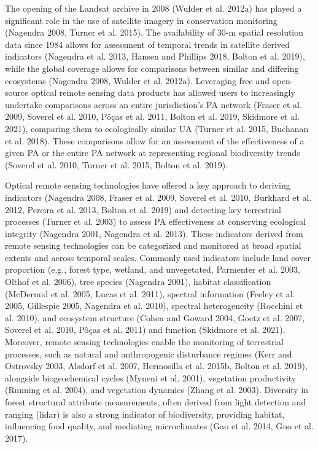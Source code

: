 \documentclass[11pt]{article}
\begin{document}
The opening of the Landsat archive in 2008 (Wulder et al. 2012a) has
played a significant role in the use of satellite imagery in
conservation monitoring (Nagendra 2008, Turner et al. 2015). The
availability of 30-m spatial resolution data since 1984 allows for
assessment of temporal trends in satellite derived indicators (Nagendra
et al. 2013, Hansen and Phillips 2018, Bolton et al. 2019), while the
global coverage allows for comparisons between similar and differing
ecosystems (Nagendra 2008, Wulder et al. 2012a). Leveraging free and
open-source optical remote sensing data products has allowed users to
increasingly undertake comparisons across an entire jurisdiction's PA
network (Fraser et al. 2009, Soverel et al. 2010, Pôças et al. 2011,
Bolton et al. 2019, Skidmore et al. 2021), comparing them to
ecologically similar UA (Turner et al. 2015, Buchanan et al. 2018).
These comparisons allow for an assessment of the effectiveness of a
given PA or the entire PA network at representing regional biodiversity
trends (Soverel et al. 2010, Turner et al. 2015, Bolton et al. 2019).

Optical remote sensing technologies have offered a key approach to
deriving indicators (Nagendra 2008, Fraser et al. 2009, Soverel et al.
2010, Burkhard et al. 2012, Pereira et al. 2013, Bolton et al. 2019) and
detecting key terrestrial processes (Turner et al. 2003) to assess PA
effectiveness at conserving ecological integrity (Nagendra 2001,
Nagendra et al. 2013). These indicators derived from remote sensing
technologies can be categorized and monitored at broad spatial extents
and across temporal scales. Commonly used indicators include land cover
proportion (e.g., forest type, wetland, and unvegetated, Parmenter et
al. 2003, Olthof et al. 2006), tree species (Nagendra 2001), habitat
classification (McDermid et al. 2005, Lucas et al. 2011), spectral
information (Feeley et al. 2005, Gillespie 2005, Nagendra et al. 2010),
spectral heterogeneity (Rocchini et al. 2010), and ecosystem structure
(Cohen and Goward 2004, Goetz et al. 2007, Soverel et al. 2010, Pôças et
al. 2011) and function (Skidmore et al. 2021). Moreover, remote sensing
technologies enable the monitoring of terrestrial processes, such as
natural and anthropogenic disturbance regimes (Kerr and Ostrovsky 2003,
Alsdorf et al. 2007, Hermosilla et al. 2015b, Bolton et al. 2019),
alongside biogeochemical cycles (Myneni et al. 2001), vegetation
productivity (Running et al. 2004), and vegetation dynamics (Zhang et
al. 2003). Diversity in forest structural attribute measurements, often
derived from light detection and ranging (lidar) is also a strong
indicator of biodiversity, providing habitat, influencing food quality,
and mediating microclimates (Gao et al. 2014, Guo et al. 2017).
\end{document}
